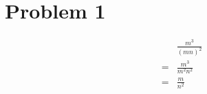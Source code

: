 \section*{Problem 1}
\begin{eqnarray*}
  & & \frac{m^3}{(mn)^2} \\
  &=& \frac{m^3}{m^2n^2} \\
  &=& \frac{m}{n^2}
\end{eqnarray*}